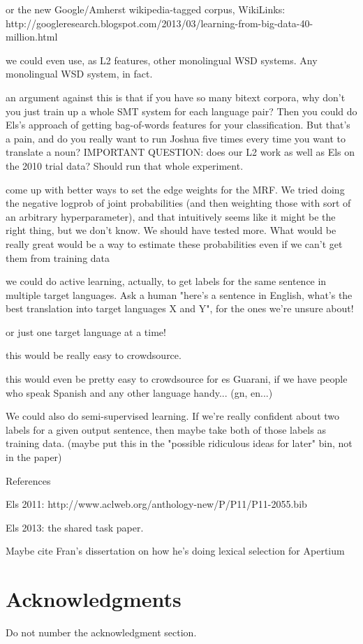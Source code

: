 \documentclass[11pt,letterpaper]{article}
\begin{document}
or the new Google/Amherst wikipedia-tagged corpus, WikiLinks:
http://googleresearch.blogspot.com/2013/03/learning-from-big-data-40-million.html


we could even use, as L2 features, other monolingual WSD systems. Any
monolingual WSD system, in fact.


an argument against this is that if you have so many bitext corpora, why
don't you just train up a whole SMT system for each language pair? Then you
could do Els's approach of getting bag-of-words features for your
classification. But that's a pain, and do you really want to run Joshua five
times every time you want to translate a noun? IMPORTANT QUESTION: does our L2
work as well as Els on the 2010 trial data? Should run that whole experiment.


come up with better ways to set the edge weights for the MRF. We tried doing
the negative logprob of joint probabilities (and then weighting those with
sort of an arbitrary hyperparameter), and that intuitively seems like it might
be the right thing, but we don't know. We should have tested more. What would
be really great would be a way to estimate these probabilities even if we
can't get them from training data

we could do active learning, actually, to get labels for the same sentence
in multiple target languages. Ask a human "here's a sentence in English, what's
the best translation into target languages X and Y", for the ones we're unsure
about!

or just one target language at a time!

this would be really easy to crowdsource.

this would even be pretty easy to crowdsource for es Guarani, if we have
people who speak Spanish and any other language handy... (gn, en...)

We could also do semi-supervised learning. If we're really confident about
two labels for a given output sentence, then maybe take both of those labels as
training data. (maybe put this in the "possible ridiculous ideas for later"
bin, not in the paper)


References

Els 2011: http://www.aclweb.org/anthology-new/P/P11/P11-2055.bib

Els 2013: the shared task paper.

Maybe cite Fran's dissertation on how he's doing lexical selection for Apertium

\cite{DBLP:books/daglib/0067131}

\section*{Acknowledgments}

Do not number the acknowledgment section.


{}
\end{document}
